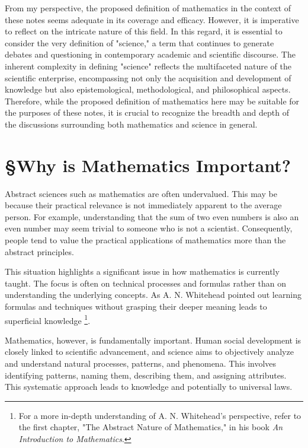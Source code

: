 From my perspective, the proposed definition of mathematics in the context of these notes seems adequate in its coverage and efficacy. However, it is imperative to reflect on the intricate nature of this field. In this regard, it is essential to consider the very definition of "science," a term that continues to generate debates and questioning in contemporary academic and scientific discourse. The inherent complexity in defining "science" reflects the multifaceted nature of the scientific enterprise, encompassing not only the acquisition and development of knowledge but also epistemological, methodological, and philosophical aspects. Therefore, while the proposed definition of mathematics here may be suitable for the purposes of these notes, it is crucial to recognize the breadth and depth of the discussions surrounding both mathematics and science in general.
\section{\S Why is Mathematics Important?}
Abstract sciences such as mathematics are often undervalued. This may be because their practical relevance is not immediately apparent to the average person. For example, understanding that the sum of two even numbers is also an even number may seem trivial to someone who is not a scientist. Consequently, people tend to value the practical applications of mathematics more than the abstract principles.

This situation highlights a significant issue in how mathematics is currently taught. The focus is often on technical processes and formulas rather than on understanding the underlying concepts. As A. N. Whitehead pointed out learning formulas and techniques without grasping their deeper meaning leads to superficial knowledge
\footnote{For a more in-depth understanding of A. N. Whitehead's perspective, refer to the first chapter, "The Abstract Nature of Mathematics," in his book \textit{An Introduction to Mathematics}.}.

Mathematics, however, is fundamentally important. Human social development is closely linked to scientific advancement, and science aims to objectively analyze and understand natural processes, patterns, and phenomena. This involves identifying patterns, naming them, describing them, and assigning attributes. This systematic approach leads to knowledge and potentially to universal laws.


